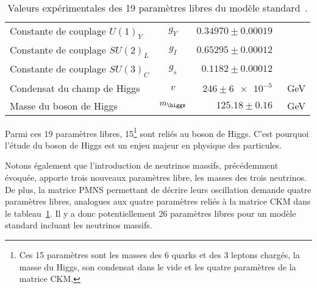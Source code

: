 \begin{table}[h]
\begin{tabular}{lcrl}
Constante de couplage $U(1)_Y$ & $g_Y$ & $\num{0.34970}\pm\num{0.00019}$ & \\
Constante de couplage $SU(2)_L$ & $g_I$ & $\num{0.65295}\pm\num{0.00012}$ & \\
Constante de couplage $SU(3)_C$ & $g_s$ & $\num{0.1182}\pm\num{0.00012}$ & \\
Condensat du champ de Higgs & $v$ & $\num{246}\pm\num{6e-5}$ & \SI{}{\GeV} \\
Masse du boson de Higgs & $m_{\higgs}$ & $\num{125.18}\pm\num{0.16}$ & \SI{}{\GeV} \\
\bottomrule
\end{tabular}
\caption[Valeurs expérimentales des 19 paramètres libres du modèle standard.]{Valeurs expérimentales des 19 paramètres libres du modèle standard~\cite{PDG_booklet_2018}.}
\label{tab-19_free_SM_parameters}
\end{table}
Parmi ces 19 paramètres libres, 15\footnote{Ces 15 paramètres sont les masses des 6 quarks et des 3 leptons chargés, la masse du Higgs, son condensat dans le vide et les quatre paramètres de la matrice CKM.} sont reliés au boson de Higgs. C'est pourquoi l'étude du boson de Higgs est un enjeu majeur en physique des particules.
\par Notons également que l'introduction de neutrinos massifs, précédemment évoquée, apporte trois nouveaux paramètres libre, les masses des trois neutrinos. De plus, la matrice PMNS permettant de décrire leurs oscillation demande quatre paramètres libres, analogues aux quatre paramètres reliés à la matrice CKM dans le tableau~\ref{tab-19_free_SM_parameters}. Il y a donc potentiellement 26 paramètres libres pour un modèle standard incluant les neutrinos massifs.
